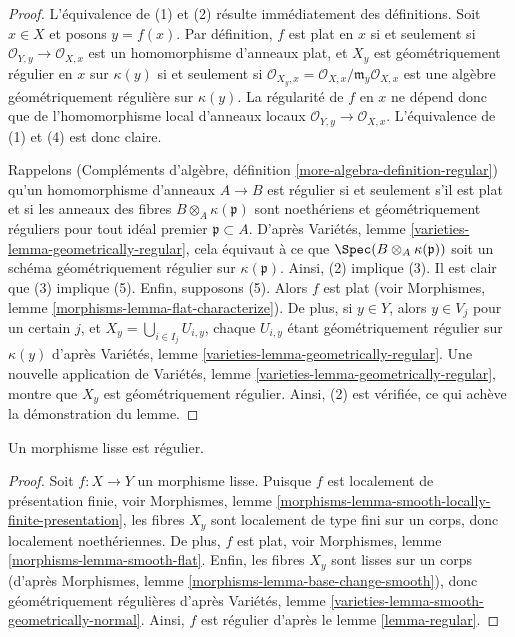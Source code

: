 \begin{proof}
L'équivalence de (1) et (2) résulte immédiatement des définitions.
Soit $x \in X$ et posons $y = f(x)$. Par définition, $f$ est plat en $x$
si et seulement si $\mathcal{O}_{Y, y} \to \mathcal{O}_{X, x}$ est un
homomorphisme d'anneaux plat, et $X_y$ est géométriquement régulier en $x$ sur
$\kappa(y)$ si et seulement si
$\mathcal{O}_{X_y, x} = \mathcal{O}_{X, x}/\mathfrak m_y\mathcal{O}_{X, x}$
est une algèbre géométriquement régulière sur $\kappa(y)$.
La régularité de $f$ en $x$
ne dépend donc que de l'homomorphisme local d'anneaux locaux
$\mathcal{O}_{Y, y} \to \mathcal{O}_{X, x}$.
L'équivalence de (1) et (4) est donc claire.

\medskip\noindent
Rappelons (Compléments d'algèbre, définition \ref{more-algebra-definition-regular})
qu'un homomorphisme d'anneaux $A \to B$ est régulier si et seulement s'il est plat
et si les anneaux des fibres $B \otimes_A \kappa(\mathfrak p)$ sont noethériens
et géométriquement réguliers pour tout idéal premier $\mathfrak p \subset A$.
D'après Variétés, lemme \ref{varieties-lemma-geometrically-regular},
cela équivaut à ce que $\Spec(B \otimes_A \kappa(\mathfrak p))$
soit un schéma géométriquement régulier sur $\kappa(\mathfrak p)$.
Ainsi, (2) implique (3). Il est clair que (3) implique
(5). Enfin, supposons (5). Alors $f$ est plat
(voir Morphismes, lemme \ref{morphisms-lemma-flat-characterize}).
De plus, si $y \in Y$, alors $y \in V_j$ pour un certain $j$, et
$X_y = \bigcup_{i \in I_j} U_{i, y}$, chaque $U_{i, y}$
étant géométriquement régulier sur $\kappa(y)$ d'après
Variétés, lemme \ref{varieties-lemma-geometrically-regular}.
Une nouvelle application de
Variétés, lemme \ref{varieties-lemma-geometrically-regular},
montre que $X_y$ est géométriquement régulier. Ainsi, (2) est vérifiée,
ce qui achève la démonstration du lemme.
\end{proof}

\begin{lemma}
\label{lemma-smooth-regular}
Un morphisme lisse est régulier.
\end{lemma}

\begin{proof}
Soit $f : X \to Y$ un morphisme lisse.
Puisque $f$ est localement de présentation finie, voir
Morphismes, lemme \ref{morphisms-lemma-smooth-locally-finite-presentation},
les fibres $X_y$ sont localement de type fini sur un corps, donc
localement noethériennes. De plus, $f$ est plat, voir
Morphismes, lemme \ref{morphisms-lemma-smooth-flat}.
Enfin, les fibres $X_y$ sont lisses sur un corps (d'après
Morphismes, lemme \ref{morphisms-lemma-base-change-smooth}),
donc géométriquement régulières d'après
Variétés, lemme \ref{varieties-lemma-smooth-geometrically-normal}.
Ainsi, $f$ est régulier d'après le
lemme \ref{lemma-regular}.
\end{proof}

